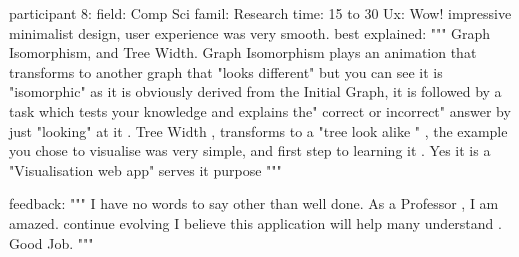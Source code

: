 participant 8:
   field: Comp Sci
   famil: Research
   time: 15 to 30
   Ux: Wow! impressive minimalist design, user experience was very smooth.
   best explained:
      """ Graph Isomorphism, and Tree Width. Graph Isomorphism plays an
      animation that transforms to another graph that "looks different" but you
      can see it is "isomorphic" as it is obviously derived from the Initial
      Graph, it is followed by a task which tests your knowledge and explains
      the" correct or incorrect" answer by just "looking" at it . Tree Width ,
      transforms to a "tree look alike " , the example you chose to visualise
      was very simple, and first step to learning it . Yes it is a
      "Visualisation web app" serves it purpose """

  feedback:
      """
      I have no words to say other than well done. As a Professor , I am
      amazed. continue evolving I believe this application will help many
      understand . Good Job.
      """
